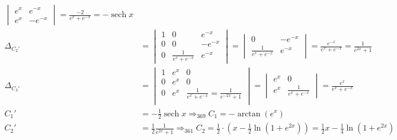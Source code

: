 \documentclass{article}
\DeclareMathOperator{\sech}{sech}
\begin{document}
\begin{align*}
\begin{vmatrix}
                             e^x & e^{-x}  \\
                             e^x & -e^{-x}
                         \end{vmatrix}=\frac{-2}{e^x+e^{-x}}=-\sech x                                                                                                 \\
    \Delta_{C_2'} & =\begin{vmatrix}
                         1 & 0                    & e^{-x}  \\
                         0 & 0                    & -e^{-x} \\
                         0 & \frac{1}{e^x+e^{-x}} & e^{-x}
                     \end{vmatrix}=\begin{vmatrix}
                                       0                    & -e^{-x} \\
                                       \frac{1}{e^x+e^{-x}} & e^{-x}
                                   \end{vmatrix} = \frac{e^{-x}}{e^x+e^{-x}}=\frac{1}{e^{2x}+1}                                                                       \\
    \Delta_{C_3'} & = \begin{vmatrix}
                          1 & e^x & 0                                          \\
                          0 & e^x & 0                                          \\
                          0 & e^x & \frac{1}{e^x+e^{-x}} = \frac{1}{e^{-2x}+1} \\
                      \end{vmatrix} = \begin{vmatrix}
                                          e^x & 0                    \\
                                          e^x & \frac{1}{e^x+e^{-x}}
                                      \end{vmatrix} = \frac{e^x}{e^x+e^{-x}}                                                                     \\
    C_1'          & = -\frac{1}{2} \sech x \Rightarrow_{369} C_1 = - \arctan(e^x)                                                                                     \\
    C_2'          & = \frac{1}{2} \frac{1}{e^{2x}+1} \Rightarrow_{361} C_2 = \frac{1}{2} \cdot (x-\frac{1}{2}\ln(1+e^{2x})) = \frac{1}{2}x - \frac{1}{4}\ln(1+e^{2x}) \\

\end{align*}
\end{document}
